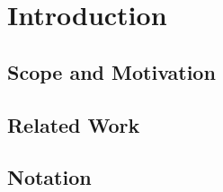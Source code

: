 
\chapter{Introduction}

\section{Scope and Motivation}
\label{sec:intro:scope}

\section{Related Work}

\section{Notation}
\label{sec:intro:notation}


